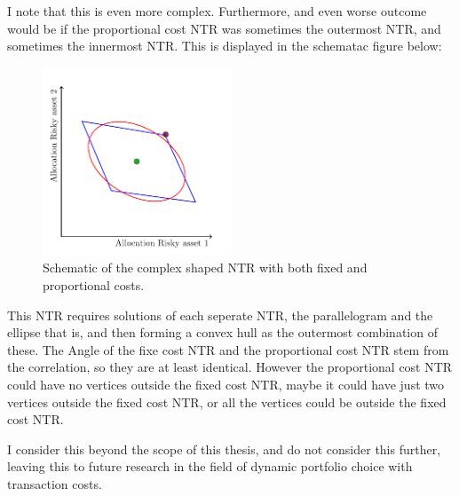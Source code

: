 \documentclass[11pt]{article}
\begin{document}
I note that this is even more complex. Furthermore, and even worse outcome would be if the proportional cost NTR was sometimes the outermost NTR, and sometimes the innermost NTR.
This is displayed in the schematac figure below:
\begin{figure}[!ht]
    \centering
    \includegraphics[width=0.5\textwidth]{../Sections/Tikz Final Figure.pdf}
    \caption{Schematic of the complex shaped NTR with both fixed and proportional costs.}
    \label{fig: Tikz_Final_TR}
\end{figure}
This NTR requires solutions of each seperate NTR, the parallelogram and the ellipse that is, and then forming a convex hull as the outermost combination of these. 
The Angle of the fixe cost NTR and the proportional cost NTR stem from the correlation, so they are at least identical. However the proportional cost NTR could have no vertices outside the fixed cost NTR,
maybe it could have just two vertices outside the fixed cost NTR, or all the vertices could be outside the fixed cost NTR.

I consider this beyond the scope of this thesis, and do not consider this further, leaving this to future research in the field of dynamic portfolio choice with transaction costs. 

\ifdefined\COMPILINGMAIN
\else
\end{document}
